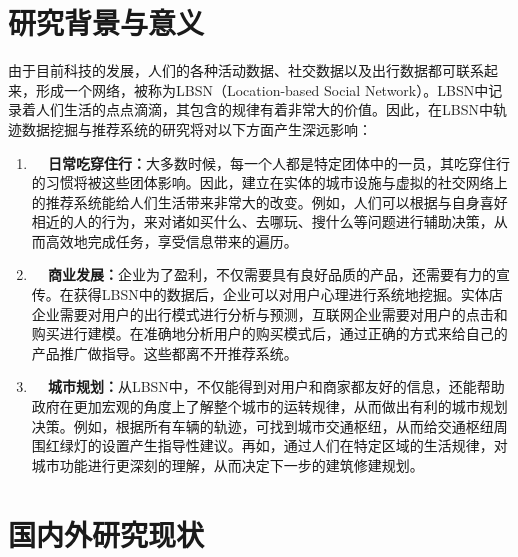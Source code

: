 \section{研究背景与意义}
由于目前科技的发展，人们的各种活动数据、社交数据以及出行数据都可联系起来，形成一个网络，被称为LBSN（Location-based Social Network）。LBSN中记录着人们生活的点点滴滴，其包含的规律有着非常大的价值。因此，在LBSN中轨迹数据挖掘与推荐系统的研究将对以下方面产生深远影响：
\begin{enumerate}
    \item \textbf{~~日常吃穿住行：}大多数时候，每一个人都是特定团体中的一员，其吃穿住行的习惯将被这些团体影响。因此，建立在实体的城市设施与虚拟的社交网络上的推荐系统能给人们生活带来非常大的改变。例如，人们可以根据与自身喜好相近的人的行为，来对诸如买什么、去哪玩、搜什么等问题进行辅助决策，从而高效地完成任务，享受信息带来的遍历。
    \item \textbf{~~商业发展：}企业为了盈利，不仅需要具有良好品质的产品，还需要有力的宣传。在获得LBSN中的数据后，企业可以对用户心理进行系统地挖掘。实体店企业需要对用户的出行模式进行分析与预测，互联网企业需要对用户的点击和购买进行建模。在准确地分析用户的购买模式后，通过正确的方式来给自己的产品推广做指导。这些都离不开推荐系统。
    \item \textbf{~~城市规划：}从LBSN中，不仅能得到对用户和商家都友好的信息，还能帮助政府在更加宏观的角度上了解整个城市的运转规律，从而做出有利的城市规划决策。例如，根据所有车辆的轨迹，可找到城市交通枢纽，从而给交通枢纽周围红绿灯的设置产生指导性建议。再如，通过人们在特定区域的生活规律，对城市功能进行更深刻的理解，从而决定下一步的建筑修建规划。
\end{enumerate}


\section{国内外研究现状}
